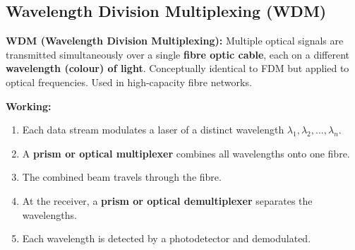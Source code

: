 \documentclass[12pt,a4paper]{article}
\begin{document}
\subsection{Wavelength Division Multiplexing (WDM)}

\begin{tcolorbox}[defbox]
\textbf{WDM (Wavelength Division Multiplexing):} Multiple optical signals are transmitted simultaneously over a single \textbf{fibre optic cable}, each on a different \textbf{wavelength (colour) of light}. Conceptually identical to FDM but applied to optical frequencies. Used in high-capacity fibre networks.
\end{tcolorbox}

\textbf{Working:}
\begin{enumerate}[label=\textbf{\arabic*.}, leftmargin=*, itemsep=3pt]
  \item Each data stream modulates a laser of a distinct wavelength $\lambda_1, \lambda_2, \ldots, \lambda_n$.
  \item A \textbf{prism or optical multiplexer} combines all wavelengths onto one fibre.
  \item The combined beam travels through the fibre.
  \item At the receiver, a \textbf{prism or optical demultiplexer} separates the wavelengths.
  \item Each wavelength is detected by a photodetector and demodulated.
\end{enumerate}
\end{document}
